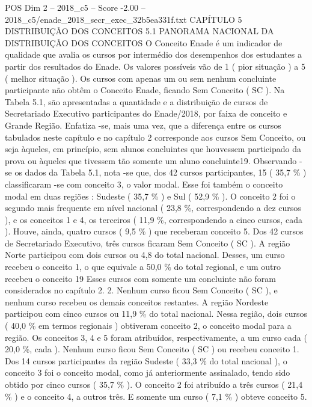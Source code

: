 \begin{textsample}{POS Dim 2 – 2018\_c5 – Score -2.00 – 2018\_c5/enade\_2018\_secr\_exec\_32b5ea331f.txt}  \label{ex:f2_pos_324}
CAPÍTULO 5 DISTRIBUIÇÃO DOS CONCEITOS 5.1 PANORAMA NACIONAL DA DISTRIBUIÇÃO DOS CONCEITOS O Conceito Enade é um indicador de qualidade que avalia os cursos por intermédio dos desempenhos dos estudantes a partir dos resultados do Enade.
Os valores possíveis vão de 1 ( pior situação ) a 5 ( melhor situação ).
Os cursos com apenas um ou sem nenhum concluinte participante não obtêm o Conceito Enade, ficando Sem Conceito ( SC ).
Na Tabela 5.1, são apresentadas a quantidade e a distribuição de cursos de Secretariado Executivo participantes do Enade/2018, por faixa de conceito e Grande Região.
Enfatiza -se, mais uma vez, que a diferença entre os cursos tabulados neste capítulo e no capítulo 2 corresponde aos cursos Sem Conceito, ou seja àqueles, em princípio, sem alunos concluintes que houvessem participado da prova ou àqueles que tivessem tão somente um aluno concluinte19.
Observando -se os dados da Tabela 5.1, nota -se que, dos 42 cursos participantes, 15 ( 35,7 \% ) classificaram -se com conceito 3, o valor modal.
Esse foi também o conceito modal em duas regiões : Sudeste ( 35,7 \% ) e Sul ( 52,9 \% ).
O conceito 2 foi o segundo mais frequente em nível nacional ( 23,8 \%, correspondendo a dez cursos ), e os conceitos 1 e 4, os terceiros ( 11,9 \%, correspondendo a cinco cursos, cada ).
Houve, ainda, quatro cursos ( 9,5 \% ) que receberam conceito 5.
Dos 42 cursos de Secretariado Executivo, três cursos ficaram Sem Conceito ( SC ).
A região Norte participou com dois cursos ou 4,8 do total nacional.
Desses, um curso recebeu o conceito 1, o que equivale a 50,0 \% do total regional, e um outro recebeu o conceito 19 Esses cursos com somente um concluinte não foram considerados no capítulo 2. 2.
Nenhum curso ficou Sem Conceito ( SC ), e nenhum curso recebeu os demais conceitos restantes.
A região Nordeste participou com cinco cursos ou 11,9 \% do total nacional.
Nessa região, dois cursos ( 40,0 \% em termos regionais ) obtiveram conceito 2, o conceito modal para a região.
Os conceitos 3, 4 e 5 foram atribuídos, respectivamente, a um curso cada ( 20,0 \%, cada ).
Nenhum curso ficou Sem Conceito ( SC ) ou recebeu conceito 1.
Dos 14 cursos participantes da região Sudeste ( 33,3 \% do total nacional ), o conceito 3 foi o conceito modal, como já anteriormente assinalado, tendo sido obtido por cinco cursos ( 35,7 \% ).
O conceito 2 foi atribuído a três cursos ( 21,4 \% ) e o conceito 4, a outros três.
E somente um curso ( 7,1 \% ) obteve conceito 5.

\end{textsample}
